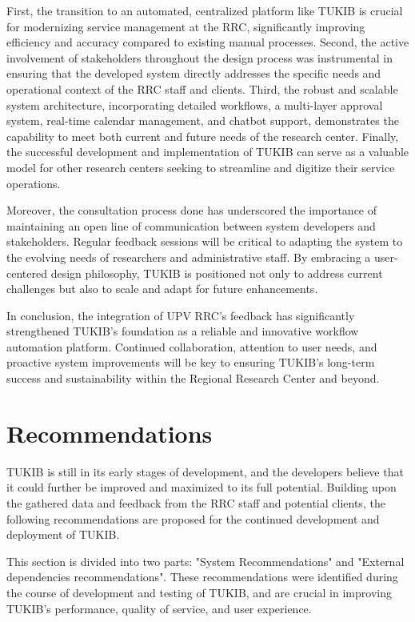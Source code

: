 First, the transition to an automated, centralized platform like TUKIB is crucial for modernizing service management at the RRC, significantly improving efficiency and accuracy compared to existing manual processes. Second, the active involvement of stakeholders throughout the design process was instrumental in ensuring that the developed system directly addresses the specific needs and operational context of the RRC staff and clients. Third, the robust and scalable system architecture, incorporating detailed workflows, a multi-layer approval system, real-time calendar management, and chatbot support, demonstrates the capability to meet both current and future needs of the research center. Finally, the successful development and implementation of TUKIB can serve as a valuable model for other research centers seeking to streamline and digitize their service operations.

Moreover, the consultation process done has underscored the importance of maintaining an open line of communication between system developers and stakeholders. Regular feedback sessions will be critical to adapting the system to the evolving needs of researchers and administrative staff. By embracing a user-centered design philosophy, TUKIB is positioned not only to address current challenges but also to scale and adapt for future enhancements.

In conclusion, the integration of UPV RRC’s feedback has significantly strengthened TUKIB’s foundation as a reliable and innovative workflow automation platform. Continued collaboration, attention to user needs, and proactive system improvements will be key to ensuring TUKIB’s long-term success and sustainability within the Regional Research Center and beyond.

\section{Recommendations}

TUKIB is still in its early stages of development, and the developers believe
that it could further be improved and maximized to its full potential. Building upon the gathered data and feedback from the RRC staff and potential clients, the following recommendations are proposed for the continued development and deployment of TUKIB. 

This section is divided into two parts: "System Recommendations" and "External dependencies recommendations". These recommendations were identified during the course of development and testing of TUKIB, and are crucial in improving TUKIB's performance, quality of service, and user experience.

